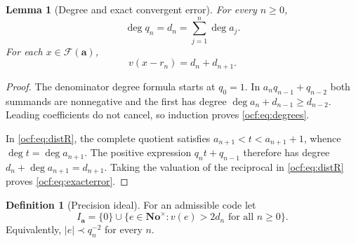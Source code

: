 \documentclass[11pt,a4paper]{article}
\numberwithin{equation}{section}
\newtheorem{lemma}[theorem]{Lemma}
\theoremstyle{definition}
\newtheorem{definition}[theorem]{Definition}
\theoremstyle{remark}
\newcommand{\No}{\mathbf{No}}
\newcommand{\F}{\mathcal F}
\newcommand{\dgr}{\operatorname{deg}}
\newcommand{\codea}{\boldsymbol a}
\begin{document}
\begin{lemma}[Degree and exact convergent error]\label{ocf:lem:degrees}
For every $n\ge0$,
\begin{equation}\label{ocf:eq:degrees}
 \dgr q_n=d_n=\sum_{j=1}^n\dgr a_j.
\end{equation}
For each $x\in\F(\codea)$,
\begin{equation}\label{ocf:eq:exacterror}
 v(x-r_n)=d_n+d_{n+1}.
\end{equation}
\end{lemma}
\begin{proof}
The denominator degree formula starts at $q_0=1$. In
$a_nq_{n-1}+q_{n-2}$ both summands are nonnegative and the first has degree
$\dgr a_n+d_{n-1}\ge d_{n-2}$. Leading coefficients do not cancel, so
induction proves \eqref{ocf:eq:degrees}.

In \eqref{ocf:eq:distR}, the complete quotient satisfies
$a_{n+1}<t<a_{n+1}+1$, whence $\dgr t=\dgr a_{n+1}$. The positive
expression $q_nt+q_{n-1}$ therefore has degree
$d_n+\dgr a_{n+1}=d_{n+1}$. Taking the valuation of the reciprocal in
\eqref{ocf:eq:distR} proves \eqref{ocf:eq:exacterror}.
\end{proof}

\begin{definition}[Precision ideal]\label{ocf:def:ideal}
For an admissible code let
\begin{equation}\label{ocf:eq:ideal}
 I_{\codea}=\{0\}\cup
 \{e\in\No^\times:v(e)>2d_n\text{ for all }n\ge0\}.
\end{equation}
Equivalently, $|e|\prec q_n^{-2}$ for every $n$.
\end{definition}
\end{document}
